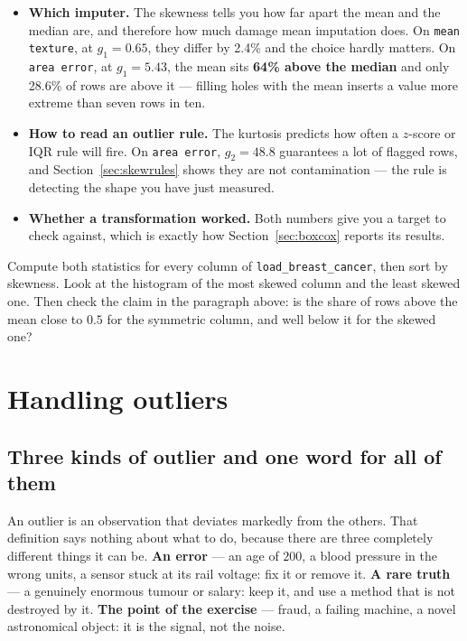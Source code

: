 \documentclass[11pt]{article}
\begin{document}
\begin{itemize}
  \item \textbf{Which imputer.} The skewness tells you how far apart the mean
    and the median are, and therefore how much damage mean imputation does. On
    \texttt{mean texture}, at $g_1 = 0.65$, they differ by 2.4\% and the choice
    hardly matters. On \texttt{area error}, at $g_1 = 5.43$, the mean sits
    \textbf{64\% above the median} and only 28.6\% of rows are above it ---
    filling holes with the mean inserts a value more extreme than seven rows in
    ten.
  \item \textbf{How to read an outlier rule.} The kurtosis predicts how often
    a $z$-score or IQR rule will fire. On \texttt{area error}, $g_2 = 48.8$
    guarantees a lot of flagged rows, and Section~\ref{sec:skewrules} shows
    they are not contamination --- the rule is detecting the shape you have
    just measured.
  \item \textbf{Whether a transformation worked.} Both numbers give you a
    target to check against, which is exactly how Section~\ref{sec:boxcox}
    reports its results.
\end{itemize}

\begin{tryit}
Compute both statistics for every column of \texttt{load\_breast\_cancer}, then
sort by skewness. Look at the histogram of the most skewed column and the least
skewed one. Then check the claim in the paragraph above: is the share of rows
above the mean close to $0.5$ for the symmetric column, and well below it for
the skewed one?
\end{tryit}

\section{Handling outliers}
\label{sec:outliers}

\subsection{Three kinds of outlier and one word for all of them}

An outlier is an observation that deviates markedly from the others. That
definition says nothing about what to do, because there are three completely
different things it can be. \textbf{An error} --- an age of $200$, a blood
pressure in the wrong units, a sensor stuck at its rail voltage: fix it or
remove it. \textbf{A rare truth} --- a genuinely enormous tumour or salary:
keep it, and use a method that is not destroyed by it. \textbf{The point of
the exercise} --- fraud, a failing machine, a novel astronomical object: it is
the signal, not the noise.
\end{document}

